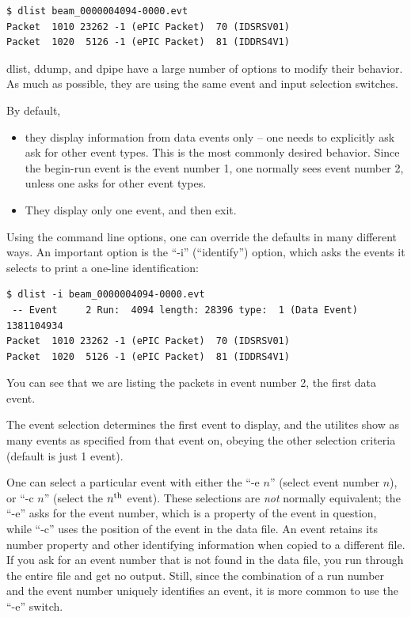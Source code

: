 \documentclass{article}[11pt]
\begin{document}
\begin{verbatim}
$ dlist beam_0000004094-0000.evt
Packet  1010 23262 -1 (ePIC Packet)  70 (IDSRSV01)
Packet  1020  5126 -1 (ePIC Packet)  81 (IDDRS4V1)
\end{verbatim}

dlist, ddump, and dpipe have a large number of options to modify their
behavior.  As much as possible, they are using the same event
and input selection switches.

By default,
\begin{itemize}
\item they display information from data events only -- one needs to
  explicitly ask ask for other event types. This is the most commonly
  desired behavior. Since the begin-run event is the event number 1,
  one normally sees event number 2, unless one asks for other event
  types.
\item They display only one event, and then exit.
\end{itemize}

Using the command line options, one can override the defaults in many
different ways. An important option is the
``-i'' (``identify'') option, which asks the events it selects to
print a one-line identification:

\begin{verbatim}
$ dlist -i beam_0000004094-0000.evt
 -- Event     2 Run:  4094 length: 28396 type:  1 (Data Event)  1381104934
Packet  1010 23262 -1 (ePIC Packet)  70 (IDSRSV01)
Packet  1020  5126 -1 (ePIC Packet)  81 (IDDRS4V1)
\end{verbatim}

You can see that we are listing the packets in event number 2, the
first data event.

The event selection determines the first event to display, and the
utilites show as many events as specified from that event on, obeying the
other selection criteria  (default is just 1 event).

One can select a particular event with either the ``-e $n$'' (select
event number $n$), or ``-c $n$'' (select the $n^{\rm th}$
event). These selections are \emph{not} normally equivalent; the
``-e'' asks for the event number, which is a property of the event in
question, while ``-c'' uses the position of the event in the data
file. An event retains its number property and other identifying
information when copied to a different file. If you ask for an event
number that is not found in the data file, you run through the entire
file and get no output. Still, since the combination of a run number
and the event number uniquely identifies an event, it is more common
to use the ``-e'' switch.
\end{document}
